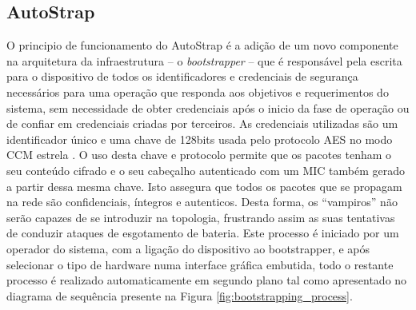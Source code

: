 \documentclass{llncs}
\begin{document}
%

\subsection{AutoStrap}
\label{sec:implementation_details}
O principio de funcionamento do AutoStrap é a adição de um novo componente na arquitetura da infraestrutura -- o \textit{bootstrapper} -- que é responsável pela escrita para o dispositivo de todos os identificadores e credenciais de segurança necessários para uma operação que responda aos objetivos e requerimentos do sistema, sem necessidade de obter credenciais após o inicio da fase de operação ou de confiar em credenciais criadas por terceiros. As credenciais utilizadas são um identificador único e uma chave de 128bits usada pelo protocolo \ac{AES} \cite{Fips2001} no modo \ac{CCM} estrela \cite{Corp2005}. O uso desta chave e protocolo permite que os pacotes tenham o seu conteúdo cifrado e o seu cabeçalho autenticado com um \ac{MIC} também gerado a partir dessa mesma chave. Isto assegura que todos os pacotes que se propagam na rede são confidenciais, íntegros e autenticos. Desta forma, os ``vampiros'' não serão capazes de se introduzir na topologia, frustrando assim as suas tentativas de conduzir ataques de esgotamento de bateria. Este processo é iniciado por um operador do sistema, com a ligação do dispositivo ao bootstrapper, e após selecionar o tipo de hardware numa interface gráfica embutida, todo o restante processo é realizado automaticamente em segundo plano tal como apresentado no diagrama de sequência presente na Figura \ref{fig:bootstrapping_process}.
\end{document}
